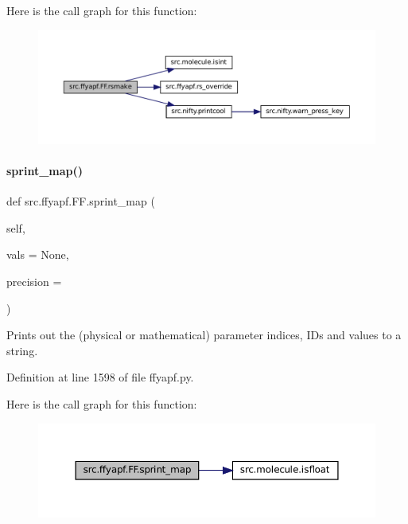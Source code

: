Here is the call graph for this function\+:
\nopagebreak
\begin{figure}[H]
\begin{center}
\leavevmode
\includegraphics[width=350pt]{classsrc_1_1ffyapf_1_1FF_a392d73844890c87025d9a5ee2e24dc80_cgraph}
\end{center}
\end{figure}
\mbox{\label{classsrc_1_1ffyapf_1_1FF_abca757d27cae3ee019e0b79f70ffd853}} 
\paragraph{\texorpdfstring{sprint\+\_\+map()}{sprint\_map()}}
{\footnotesize\ttfamily def src.\+ffyapf.\+F\+F.\+sprint\+\_\+map (\begin{DoxyParamCaption}\item[{}]{self,  }\item[{}]{vals = {\ttfamily None},  }\item[{}]{precision = {} }\end{DoxyParamCaption})}



Prints out the (physical or mathematical) parameter indices, I\+Ds and values to a string. 



Definition at line 1598 of file ffyapf.\+py.

Here is the call graph for this function\+:
\nopagebreak
\begin{figure}[H]
\begin{center}
\leavevmode
\includegraphics[width=350pt]{classsrc_1_1ffyapf_1_1FF_abca757d27cae3ee019e0b79f70ffd853_cgraph}
\end{center}
\end{figure}


